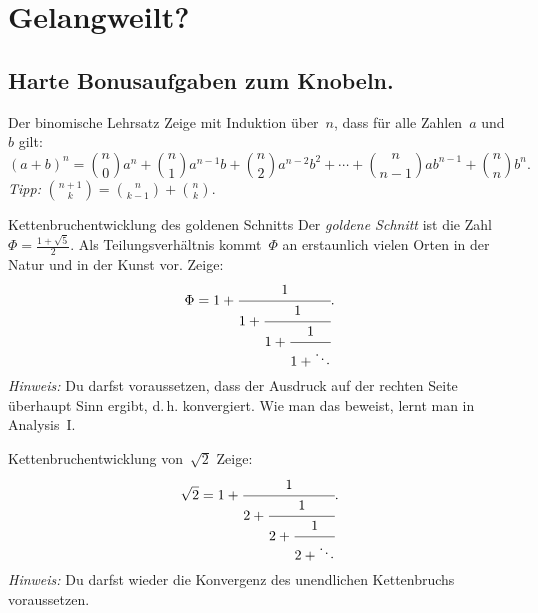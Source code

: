 \documentclass{../zirkelblatt1415}
\begin{document}
\pagestyle{empty}
\enlargethispage{4.5cm}
\vspace*{-2.5cm}

\section*{Gelangweilt?}
\subsection*{Harte Bonusaufgaben zum Knobeln.}

\begin{aufgabe}{Der binomische Lehrsatz}
Zeige mit Induktion über~$n$, dass für alle Zahlen~$a$ und~$b$ gilt:
\[ (a + b)^n =
  \binom{n}{0} a^n +
  \binom{n}{1} a^{n-1} b +
  \binom{n}{2} a^{n-2} b^2 + \cdots +
  \binom{n}{n-1} a b^{n-1} +
  \binom{n}{n} b^n. \]
\emph{Tipp:} $\binom{n+1}{k} = \binom{n}{k-1} + \binom{n}{k}$.
\end{aufgabe}

\begin{aufgabe}{Kettenbruchentwicklung des goldenen Schnitts}
\label{aufg:phi}
Der \emph{goldene Schnitt} ist die Zahl~$\Phi = \frac{1 + \sqrt{5}}{2}$. Als
Teilungsverhältnis kommt~$\Phi$ an erstaunlich vielen Orten in der Natur und in
der Kunst vor. Zeige:
\[ \Phi = 1 + \cfrac{1}{1 + \cfrac{1}{1 + \cfrac{1}{1 + \ddots}}}. \]
\emph{Hinweis:} Du darfst voraussetzen, dass der Ausdruck auf der rechten Seite
überhaupt Sinn ergibt, d.\,h. konvergiert. Wie man das beweist, lernt man in
Analysis~I.
\end{aufgabe}

\begin{aufgabe}{Kettenbruchentwicklung von~$\sqrt{2}$}
Zeige:
\[ \sqrt{2} = 1 + \cfrac{1}{2 + \cfrac{1}{2 + \cfrac{1}{2 + \ddots}}}. \]
\emph{Hinweis:} Du darfst wieder die Konvergenz des
unendlichen Kettenbruchs voraussetzen.
\end{aufgabe}
\end{document}
